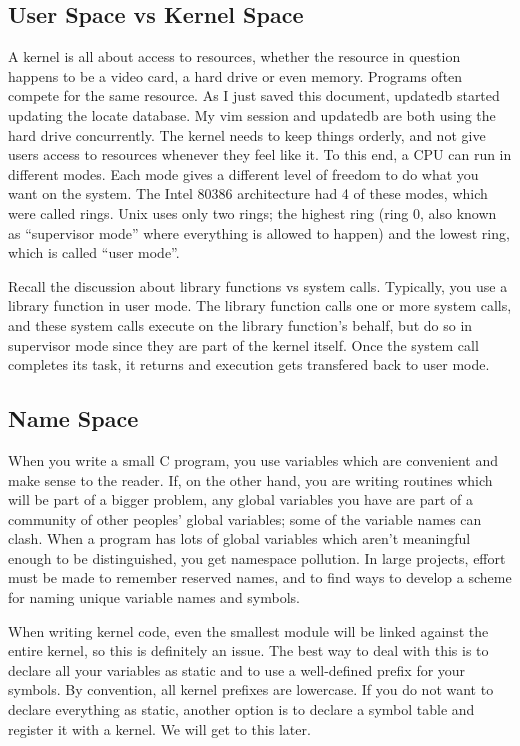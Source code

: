 \documentclass[10pt, oneside]{book}
\begin{document}
\subsection{User Space vs Kernel Space}
\label{sec:user_kernl_space}
A kernel is all about access to resources, whether the resource in question happens to be a video card, a hard drive or even memory.
Programs often compete for the same resource. As I just saved this document, updatedb started updating the locate database.
My vim session and updatedb are both using the hard drive concurrently.
The kernel needs to keep things orderly, and not give users access to resources whenever they feel like it.
To this end, a CPU can run in different modes.
Each mode gives a different level of freedom to do what you want on the system.
The Intel 80386 architecture had 4 of these modes, which were called rings. Unix uses only two rings; the highest ring (ring 0, also known as ``supervisor mode'' where everything is allowed to happen) and the lowest ring, which is called ``user mode''.

Recall the discussion about library functions vs system calls.
Typically, you use a library function in user mode.
The library function calls one or more system calls, and these system calls execute on the library function's behalf, but do so in supervisor mode since they are part of the kernel itself.
Once the system call completes its task, it returns and execution gets transfered back to user mode.

\subsection{Name Space}
\label{sec:namespace}
When you write a small C program, you use variables which are convenient and make sense to the reader.
If, on the other hand, you are writing routines which will be part of a bigger problem, any global variables you have are part of a community of other peoples' global variables; some of the variable names can clash.
When a program has lots of global variables which aren't meaningful enough to be distinguished, you get namespace pollution.
In large projects, effort must be made to remember reserved names, and to find ways to develop a scheme for naming unique variable names and symbols.

When writing kernel code, even the smallest module will be linked against the entire kernel, so this is definitely an issue.
The best way to deal with this is to declare all your variables as static and to use a well-defined prefix for your symbols.
By convention, all kernel prefixes are lowercase. If you do not want to declare everything as static, another option is to declare a symbol table and register it with a kernel.
We will get to this later.
\end{document}
